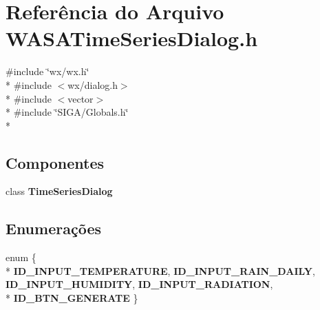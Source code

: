 \section{Referência do Arquivo W\+A\+S\+A\+Time\+Series\+Dialog.\+h}
\label{_w_a_s_a_time_series_dialog_8h}
{\ttfamily \#include \char`\"{}wx/wx.\+h\char`\"{}}\\*
{\ttfamily \#include $<$wx/dialog.\+h$>$}\\*
{\ttfamily \#include $<$vector$>$}\\*
{\ttfamily \#include \char`\"{}S\+I\+G\+A/\+Globals.\+h\char`\"{}}\\*
\subsection*{Componentes}
\begin{DoxyCompactItemize}
\item 
class {\bf Time\+Series\+Dialog}
\end{DoxyCompactItemize}
\subsection*{Enumerações}
\begin{DoxyCompactItemize}
\item 
enum \{ \\*
{\bf I\+D\+\_\+\+I\+N\+P\+U\+T\+\_\+\+T\+E\+M\+P\+E\+R\+A\+T\+U\+RE}, 
{\bf I\+D\+\_\+\+I\+N\+P\+U\+T\+\_\+\+R\+A\+I\+N\+\_\+\+D\+A\+I\+LY}, 
{\bf I\+D\+\_\+\+I\+N\+P\+U\+T\+\_\+\+H\+U\+M\+I\+D\+I\+TY}, 
{\bf I\+D\+\_\+\+I\+N\+P\+U\+T\+\_\+\+R\+A\+D\+I\+A\+T\+I\+ON}, 
\\*
{\bf I\+D\+\_\+\+B\+T\+N\+\_\+\+G\+E\+N\+E\+R\+A\+TE}
 \}
\end{DoxyCompactItemize}
